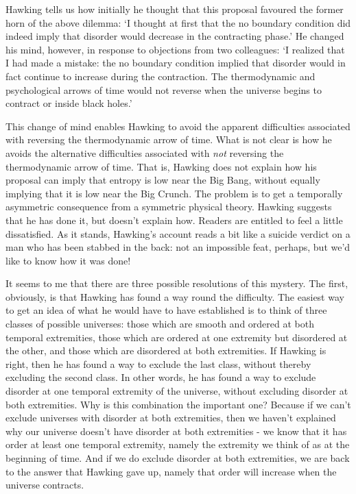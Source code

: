 Hawking tells us how initially he thought that this proposal favoured
the former horn of the above dilemma: `I thought at first that the no
boundary condition did indeed imply that disorder would decrease in the
contracting phase.'  He changed his mind, however, in response to
objections from two colleagues: `I realized that I had made a mistake:
the no boundary condition implied that disorder would in fact continue
to increase during the contraction. The thermodynamic and psychological
arrows of time would not reverse when the universe begins to contract or
inside black holes.'

This change of mind enables Hawking to avoid the apparent difficulties
associated with reversing the thermodynamic arrow of time. What is not
clear is how he avoids the alternative difficulties associated with 
\emph{not} reversing the thermodynamic arrow of time. That is, Hawking
does not explain how his proposal can imply that entropy is low near the
Big Bang, without equally implying that it is low near the Big Crunch.
The problem is to get a temporally asymmetric consequence from a
symmetric physical theory. Hawking suggests that he has done it, but
doesn't explain how. Readers are entitled to feel a little dissatisfied.
As it stands, Hawking's account reads a bit like a suicide verdict on a
man who has been stabbed in the back: not an impossible feat, perhaps,
but we'd like to know how it was done!
 
It seems to me that there are three possible resolutions of this
mystery. The first, obviously, is that Hawking has found a way round the
difficulty. The easiest way to get an idea of what he would have to have
established is to think of three classes of possible universes: those
which are smooth and ordered at both temporal extremities, those which
are ordered at one extremity but disordered at the other, and those
which are disordered at both extremities. If Hawking is right, then he
has found a way to exclude the last class, without thereby excluding the
second class. In other words, he has found a way to exclude disorder at
one temporal extremity of the universe, without excluding disorder at
both extremities. Why is this combination the important one? Because if
we can't exclude universes with disorder at both extremities, then we
haven't explained why our universe doesn't have disorder at both
extremities - we know that it has order at least one temporal extremity,
namely the extremity we think of as at the beginning of time. And if we
do exclude disorder at both extremities, we are back to the answer that
Hawking gave up, namely that order will increase when the universe
contracts.
 

